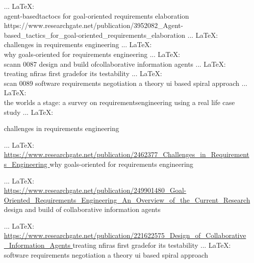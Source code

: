 \bibitem{ } ... \LaTeX:\\ \url{ }
agent-basedtactocs for goal-oriented requirements elaboration
https://www.researchgate.net/publication/3952082_Agent-based_tactics_for_goal-oriented_requirements_elaboration
\bibitem{ } ... \LaTeX:\\ \url{ }
challenges in requirements engineering
\bibitem{ } ... \LaTeX:\\ \url{ }
why goals-oriented for requirements engineering
\bibitem{ } ... \LaTeX:\\ \url{ }
scann 0087
design and build ofcollaborative information agents
\bibitem{ } ... \LaTeX:\\ \url{ }
treating nfiras first gradefor its testability
\bibitem{ } ... \LaTeX:\\ \url{ }
scan 0089
software requirements negotiation a theory ui based spiral approach
\bibitem{ } ... \LaTeX:\\ \url{ }
the worlds a stage: a survey on requirementsengineering using a real life case study
\bibitem{ } ... \LaTeX:\\ \url{ }




challenges in requirements engineering

 ... \LaTeX:\\ \url{https://www.researchgate.net/publication/2462377_Challenges_in_Requirements_Engineering }
why goals-oriented for requirements engineering

 ... \LaTeX:\\ \url{https://www.researchgate.net/publication/249901480_Goal-Oriented_Requirements_Engineering_An_Overview_of_the_Current_Research }
design and build of collaborative information agents

 ... \LaTeX:\\ \url{https://www.researchgate.net/publication/221622575_Design_of_Collaborative_Information_Agents }
treating nfiras first gradefor its testability
\bibitem{ } ... \LaTeX:\\ \url{ }
software requirements negotiation a theory ui based spiral approach


